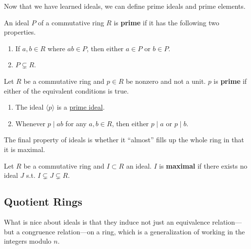   Now that we have learned ideals, we can define prime ideals and prime elements. 
  
  \begin{definition}
    \label{def:prime-ideal}
    An ideal $P$ of a commutative ring $R$ is \textbf{prime} if it has the following two properties. 
    \begin{enumerate}
      \item If $a, b \in R$ where $ab \in P$, then either $a \in P$ or $b \in P$. 
      \item $P \subsetneq R$. 
    \end{enumerate}
  \end{definition}

  \begin{definition}
    \label{def:prime-elements}
    Let $R$ be a commutative ring and $p \in R$ be nonzero and not a unit. $p$ is \textbf{prime} if either of the equivalent conditions is true. 
    \begin{enumerate}
      \item The ideal $\langle p \rangle$ is a \hyperref[def:prime-ideal]{prime ideal}. 
      \item Whenever $p \mid ab$ for any $a, b \in R$, then either $p \mid a$ or $p \mid b$. 
    \end{enumerate}
  \end{definition}

  The final property of ideals is whether it ``almost'' fills up the whole ring in that it is maximal. 

  \begin{definition}
    \label{def:maximal-ideal}
    Let $R$ be a commutative ring and $I \subset R$ an ideal. $I$ is \textbf{maximal} if there exists no ideal $J$ s.t. $I \subsetneq J \subsetneq R$. 
  \end{definition}

\subsection{Quotient Rings}

  What is nice about ideals is that they induce not just an equivalence relation---but a congruence relation---on a ring, which is a generalization of working in the integers modulo $n$. 

